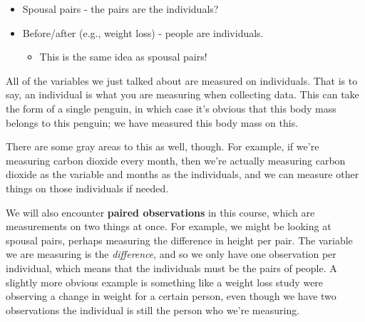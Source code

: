 \documentclass[
  letterpaper,
  DIV=11,
  numbers=noendperiod,
  oneside]{scrreprt}
\providecommand{\tightlist}{%
  \setlength{\itemsep}{0pt}\setlength{\parskip}{0pt}}\usepackage{longtable,booktabs,array}
\begin{document}

\begin{tcolorbox}[enhanced jigsaw, toprule=.15mm, colbacktitle=quarto-callout-warning-color!10!white, title=\textcolor{quarto-callout-warning-color}{\faExclamationTriangle}\hspace{0.5em}{Paired Observations}, arc=.35mm, colframe=quarto-callout-warning-color-frame, colback=white, titlerule=0mm, left=2mm, bottomtitle=1mm, bottomrule=.15mm, breakable, opacitybacktitle=0.6, leftrule=.75mm, toptitle=1mm, coltitle=black, rightrule=.15mm, opacityback=0]

\begin{itemize}
\tightlist
\item
  Spousal pairs - the pairs are the individuals?
\item
  Before/after (e.g., weight loss) - people are individuals.

  \begin{itemize}
  \tightlist
  \item
    This is the same idea as spousal pairs!
  \end{itemize}
\end{itemize}

\end{tcolorbox}

All of the variables we just talked about are measured on individuals.
That is to say, an individual is what you are measuring when collecting
data. This can take the form of a single penguin, in which case it's
obvious that this body mass belongs to this penguin; we have measured
this body mass on this.

There are some gray areas to this as well, though. For example, if we're
measuring carbon dioxide every month, then we're actually measuring
carbon dioxide as the variable and months as the individuals, and we can
measure other things on those individuals if needed.

We will also encounter \textbf{paired observations} in this course,
which are measurements on two things at once. For example, we might be
looking at spousal pairs, perhaps measuring the difference in height per
pair. The variable we are measuring is the \emph{difference}, and so we
only have one observation per individual, which means that the
individuals must be the pairs of people. A slightly more obvious example
is something like a weight loss study were observing a change in weight
for a certain person, even though we have two observations the
individual is still the person who we're
measuring.{}
\end{document}
